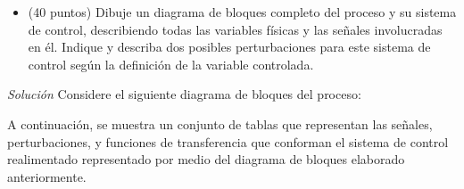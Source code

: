 \begin{itemize}
    \item (40 puntos) Dibuje un diagrama de bloques completo del proceso y su sistema de control, describiendo todas las variables físicas y las señales involucradas en él. 
        Indique y describa dos posibles perturbaciones para este sistema de control según la definición de la variable controlada.
\end{itemize}

\pagebreak

\textit{Solución}
Considere el siguiente diagrama de bloques del proceso:



A continuación, se muestra un conjunto de tablas que representan las señales, perturbaciones, y funciones de transferencia que conforman el sistema de control realimentado representado por medio del diagrama de bloques elaborado anteriormente.


\pagebreak

\pagebreak

\pagebreak

